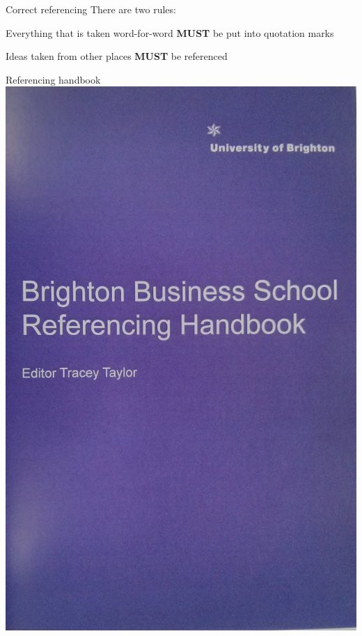 \documentclass[14pt,xcolor=pdftex,dvipsnames,table]{beamer}\usepackage[]{graphicx}\usepackage[]{color}
\begin{document}
\begin{frame}{Correct referencing}
There are two rules: 
\pause
\begin{block}{}
Everything that is taken word-for-word \textbf{MUST} be put into quotation marks
\end{block}
\pause
\vspace{1cm}
\begin{block}{}
Ideas taken from other places \textbf{MUST} be referenced
\end{block}
\end{frame}

\begin{frame}{Referencing handbook}
\centering
\includegraphics[scale = 0.2]{"ref"}
\end{frame}
\end{document}
